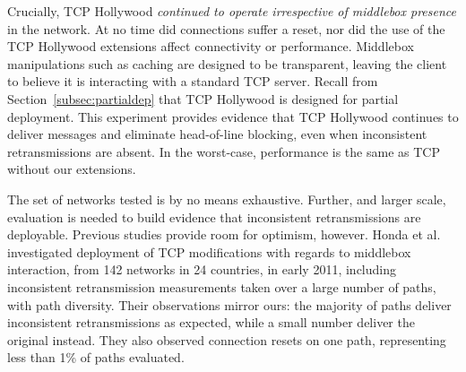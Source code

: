 Crucially, TCP Hollywood {\em continued to operate irrespective of middlebox
presence} in the network. At no time did connections suffer a reset, nor did the
use of the TCP Hollywood extensions affect connectivity or performance.
Middlebox manipulations such as caching are designed to be transparent, leaving
the client to believe it is interacting with a standard TCP server. Recall from
Section~\ref{subsec:partialdep} that TCP Hollywood is designed for partial
deployment. This experiment provides evidence that TCP Hollywood continues to
deliver messages and eliminate head-of-line blocking, even when inconsistent
retransmissions are absent. In the worst-case, performance is the same as TCP
without our extensions.

The set of networks tested is by no means exhaustive. Further, and larger scale,
evaluation is needed to build evidence that inconsistent retransmissions are
deployable. Previous studies provide room for optimism, however. Honda et al.
\cite{honda:2011:extend-tcp} investigated deployment of TCP modifications with
regards to middlebox interaction, from 142 networks in 24 countries, in early
2011, including inconsistent retransmission measurements taken over a large
number of paths, with path diversity. Their observations mirror ours: the
majority of paths deliver inconsistent retransmissions as expected, while a
small number deliver the original instead. They also observed connection resets
on one path, representing less than 1\% of paths evaluated.

